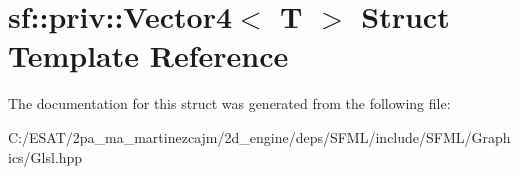 \hypertarget{structsf_1_1priv_1_1_vector4}{}\section{sf\+:\+:priv\+:\+:Vector4$<$ T $>$ Struct Template Reference}
\label{structsf_1_1priv_1_1_vector4}


The documentation for this struct was generated from the following file\+:\begin{DoxyCompactItemize}
\item 
C\+:/\+E\+S\+A\+T/2pa\+\_\+ma\+\_\+martinezcajm/2d\+\_\+engine/deps/\+S\+F\+M\+L/include/\+S\+F\+M\+L/\+Graphics/Glsl.\+hpp\end{DoxyCompactItemize}
